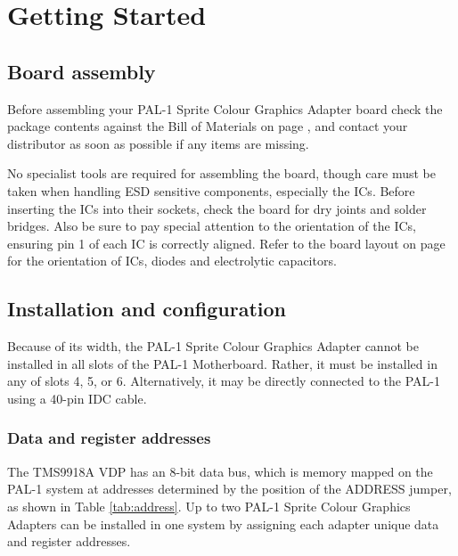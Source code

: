 \documentclass[a4paper,11pt,twoside,openright]{report}
\newcommand\mainmatter{
  \cleardoublepage
  \pagenumbering{arabic}}
\begin{document}
\mainmatter
\chapter{Getting Started}
\section*{Board assembly}
Before assembling your PAL-1 Sprite Colour Graphics Adapter board check the package contents against the Bill of Materials on page \pageref{sec:bom}, and contact your distributor as soon as possible if any items are missing.

No specialist tools are required for assembling the board, though care must be taken when handling ESD sensitive components, especially the ICs. Before inserting the ICs into their sockets, check the board for dry joints and solder bridges. Also be sure to pay special attention to the orientation of the ICs, ensuring pin 1 of each IC is correctly aligned. Refer to the board layout on page \pageref{fig:layout} for the orientation of ICs, diodes and electrolytic capacitors.

\section*{Installation and configuration}
\label{sec:configuration}

Because of its width, the PAL-1 Sprite Colour Graphics Adapter cannot be installed in all slots of the PAL-1 Motherboard.\cite{ganning2} Rather, it must be installed in any of slots 4, 5, or 6. Alternatively, it may be directly connected to the PAL-1 using a 40-pin IDC cable.


\subsection*{Data and register addresses}
The TMS9918A VDP has an 8-bit data bus, which is memory mapped on the PAL-1 system at addresses determined by the position of the \textsf{ADDRESS} jumper, as shown in Table \ref{tab:address}. Up to two PAL-1 Sprite Colour Graphics Adapters can be installed in one system by assigning each adapter unique data and register addresses.
\end{document}
